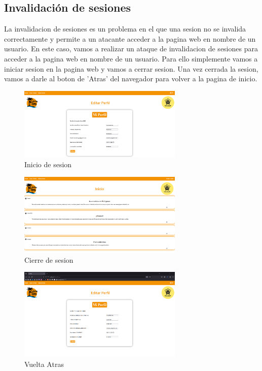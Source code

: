 \documentclass{report}
\begin{document}
            \subsection{Invalidación de sesiones}
                La invalidacion de sesiones es un problema en el que una sesion no se invalida correctamente y permite a un atacante acceder a la pagina web en nombre de un usuario.
                En este caso, vamos a realizar un ataque de invalidacion de sesiones para acceder a la pagina web en nombre de un usuario.
                Para ello simplemente vamos a iniciar sesion en la pagina web y vamos a cerrar sesion.
                Una vez cerrada la sesion, vamos a darle al boton de 'Atras' del navegador para volver a la pagina de inicio.
                \begin{figure}[H]
                    \centering
                    \includegraphics[width=0.7\textwidth]{./img/vulnerabilidades/2.6/1.1.png}
                    \caption{Inicio de sesion}
                \end{figure}
                \begin{figure}[H]
                    \centering
                    \includegraphics[width=0.7\textwidth]{./img/vulnerabilidades/2.6/1.2.png}
                    \caption{Cierre de sesion}
                \end{figure}
                \begin{figure}[H]
                    \centering
                    \includegraphics[width=0.7\textwidth]{./img/vulnerabilidades/2.6/1.3.png}
                    \caption{Vuelta Atras}
                \end{figure}
\end{document}
